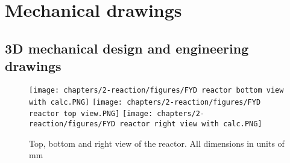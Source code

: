 \section{Mechanical drawings}
\label{app:reactor-drawings}
\subsection{3D mechanical design and engineering drawings}
\label{app:engineeringdesign}

\begin{figure}[H]
    \centering
    \texttt{[image: chapters/2-reaction/figures/FYD reactor bottom view with calc.PNG]}
    \texttt{[image: chapters/2-reaction/figures/FYD reactor top view.PNG]}
    \texttt{[image: chapters/2-reaction/figures/FYD reactor right view with calc.PNG]}
    \caption{Top, bottom and right view of the reactor. All dimensions in units of mm}
    \label{fig:reactortopbottomrightview}
\end{figure}